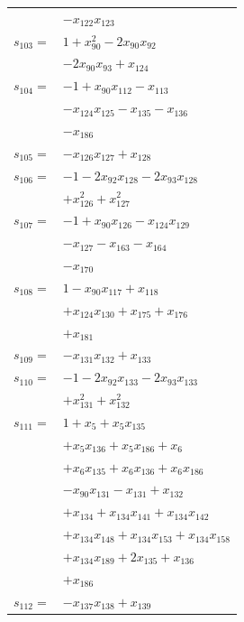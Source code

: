 \begin{longtable}{@{}r@{\;}l@{}}
 & \(\displaystyle -x_{122}x_{123}\) \\[3pt]
\(s_{103}=\) & \(\displaystyle 1 +x_{90}^{2} -2x_{90}x_{92}\) \\
 & \(\displaystyle -2x_{90}x_{93} +x_{124}\) \\[3pt]
\(s_{104}=\) & \(\displaystyle -1 +x_{90}x_{112} -x_{113}\) \\
 & \(\displaystyle -x_{124}x_{125} -x_{135} -x_{136}\) \\
 & \(\displaystyle -x_{186}\) \\[3pt]
\(s_{105}=\) & \(\displaystyle -x_{126}x_{127} +x_{128}\) \\[3pt]
\(s_{106}=\) & \(\displaystyle -1 -2x_{92}x_{128} -2x_{93}x_{128}\) \\
 & \(\displaystyle +x_{126}^{2} +x_{127}^{2}\) \\[3pt]
\(s_{107}=\) & \(\displaystyle -1 +x_{90}x_{126} -x_{124}x_{129}\) \\
 & \(\displaystyle -x_{127} -x_{163} -x_{164}\) \\
 & \(\displaystyle -x_{170}\) \\[3pt]
\(s_{108}=\) & \(\displaystyle 1 -x_{90}x_{117} +x_{118}\) \\
 & \(\displaystyle +x_{124}x_{130} +x_{175} +x_{176}\) \\
 & \(\displaystyle +x_{181}\) \\[3pt]
\(s_{109}=\) & \(\displaystyle -x_{131}x_{132} +x_{133}\) \\[3pt]
\(s_{110}=\) & \(\displaystyle -1 -2x_{92}x_{133} -2x_{93}x_{133}\) \\
 & \(\displaystyle +x_{131}^{2} +x_{132}^{2}\) \\[3pt]
\(s_{111}=\) & \(\displaystyle 1 +x_{5} +x_{5}x_{135}\) \\
 & \(\displaystyle +x_{5}x_{136} +x_{5}x_{186} +x_{6}\) \\
 & \(\displaystyle +x_{6}x_{135} +x_{6}x_{136} +x_{6}x_{186}\) \\
 & \(\displaystyle -x_{90}x_{131} -x_{131} +x_{132}\) \\
 & \(\displaystyle +x_{134} +x_{134}x_{141} +x_{134}x_{142}\) \\
 & \(\displaystyle +x_{134}x_{148} +x_{134}x_{153} +x_{134}x_{158}\) \\
 & \(\displaystyle +x_{134}x_{189} +2x_{135} +x_{136}\) \\
 & \(\displaystyle +x_{186}\) \\[3pt]
\(s_{112}=\) & \(\displaystyle -x_{137}x_{138} +x_{139}\) \\[3pt]

\end{longtable}
